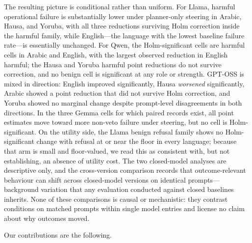 The resulting picture is conditional rather than uniform. For Llama, harmful
operational failure is substantially lower under planner-only steering in
Arabic, Hausa, and Yoruba, with all three reductions surviving Holm correction
inside the harmful family, while English---the language with the lowest baseline
failure rate---is essentially unchanged. For Qwen, the Holm-significant cells are
harmful cells in Arabic and English, with the largest observed reduction in
English harmful; the Hausa and Yoruba harmful point reductions do not survive
correction, and no benign cell is significant at any role or strength. GPT-OSS is
mixed in direction: English improved significantly, Hausa \emph{worsened}
significantly, Arabic showed a point reduction that did not survive Holm
correction, and Yoruba showed no marginal change despite prompt-level
disagreements in both directions. In the three Gemma cells for which paired
records exist, all point estimates move toward more non-veto failure under
steering, but no cell is Holm-significant. On the utility side, the Llama benign
refusal family shows no Holm-significant change with refusal at or near the floor
in every language; because that arm is small and floor-valued, we read this as
consistent with, but not establishing, an absence of utility cost. The two
closed-model analyses are descriptive only, and the cross-version comparison
records that outcome-relevant behaviour can shift across closed-model versions on
identical prompts---background variation that any evaluation conducted against
closed baselines inherits. None of these comparisons is causal or mechanistic:
they contrast conditions on matched prompts within single model entries and
license no claim about why outcomes moved.

Our contributions are the following.

